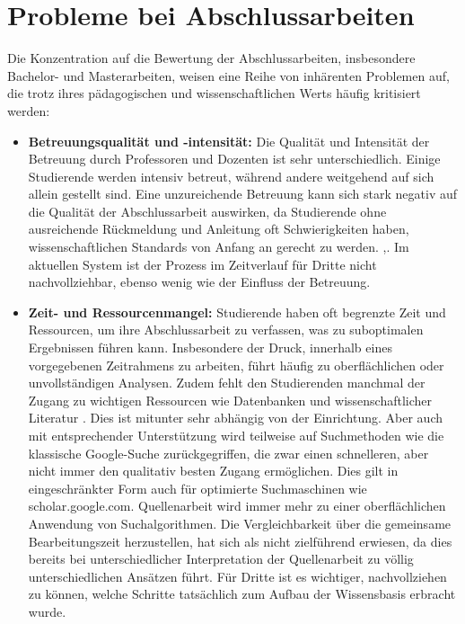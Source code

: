 \documentclass[conference]{IEEEtran}
\begin{document}
\section{Probleme bei Abschlussarbeiten}

Die Konzentration auf die Bewertung der Abschlussarbeiten, insbesondere Bachelor- und Masterarbeiten, weisen eine Reihe von inhärenten Problemen auf, die trotz ihres pädagogischen und wissenschaftlichen Werts häufig kritisiert werden:

\begin{itemize}[leftmargin=*]
    \item \textbf{Betreuungsqualität und -intensität:}
    \newline Die Qualität und Intensität der Betreuung durch Professoren und Dozenten ist sehr unterschiedlich. Einige Studierende werden intensiv betreut, während andere weitgehend auf sich allein gestellt sind. Eine unzureichende Betreuung kann sich stark negativ auf die Qualität der Abschlussarbeit auswirken, da Studierende ohne ausreichende Rückmeldung und Anleitung oft Schwierigkeiten haben, wissenschaftlichen Standards von Anfang an gerecht zu werden. \cite{betreuungsleistung2023},\cite{ghadirian2014}.  Im aktuellen System ist der Prozess im Zeitverlauf für Dritte nicht nachvollziehbar, ebenso wenig wie der Einfluss der Betreuung. 

    \item \textbf{Zeit- und Ressourcenmangel:}
    \newline Studierende haben oft begrenzte Zeit und Ressourcen, um ihre Abschlussarbeit zu verfassen, was zu suboptimalen Ergebnissen führen kann. Insbesondere der Druck, innerhalb eines vorgegebenen Zeitrahmens zu arbeiten, führt häufig zu oberflächlichen oder unvollständigen Analysen. Zudem fehlt den Studierenden manchmal der Zugang zu wichtigen Ressourcen wie Datenbanken und wissenschaftlicher Literatur \cite{Rabab}. Dies ist mitunter sehr abhängig von der Einrichtung. Aber auch mit entsprechender Unterstützung wird teilweise auf Suchmethoden wie die klassische Google-Suche zurückgegriffen, die zwar einen schnelleren, aber nicht immer den qualitativ besten Zugang ermöglichen. Dies gilt in eingeschränkter Form auch für optimierte Suchmaschinen wie scholar.google.com. Quellenarbeit wird immer mehr zu einer oberflächlichen Anwendung von Suchalgorithmen. Die Vergleichbarkeit über die gemeinsame Bearbeitungszeit herzustellen, hat sich als nicht zielführend erwiesen, da dies bereits bei unterschiedlicher Interpretation der Quellenarbeit zu völlig unterschiedlichen Ansätzen führt. Für Dritte ist es wichtiger, nachvollziehen zu können, welche Schritte tatsächlich zum Aufbau der Wissensbasis erbracht wurde. 


\end{itemize}
\end{document}
